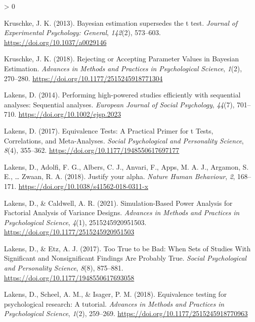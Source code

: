 \documentclass[
  english,
  ,jou,floatsintext]{apa6}
\newlength{\cslhangindent}
\newenvironment{CSLReferences}[2] %
 {%
  \setlength{\parindent}{0pt}
  \ifodd #1 \everypar{\setlength{\hangindent}{\cslhangindent}}\ignorespaces\fi
  \ifnum #2 > 0
  \setlength{\parskip}{#2\baselineskip}
  \fi
 }%
 {}
\begin{document}
\begin{CSLReferences}{1}{0}
\leavevmode\hypertarget{ref-kruschke_bayesian_2013}{}%
Kruschke, J. K. (2013). Bayesian estimation supersedes the t test. \emph{Journal of Experimental Psychology: General}, \emph{142}(2), 573--603. \url{https://doi.org/10.1037/a0029146}

\leavevmode\hypertarget{ref-kruschke_rejecting_2018}{}%
Kruschke, J. K. (2018). Rejecting or {Accepting Parameter Values} in {Bayesian Estimation}. \emph{Advances in Methods and Practices in Psychological Science}, \emph{1}(2), 270--280. \url{https://doi.org/10.1177/2515245918771304}

\leavevmode\hypertarget{ref-lakens_performing_2014}{}%
Lakens, D. (2014). Performing high-powered studies efficiently with sequential analyses: {Sequential} analyses. \emph{European Journal of Social Psychology}, \emph{44}(7), 701--710. \url{https://doi.org/10.1002/ejsp.2023}

\leavevmode\hypertarget{ref-lakens_equivalence_2017}{}%
Lakens, D. (2017). Equivalence {Tests}: {A Practical Primer} for t {Tests}, {Correlations}, and {Meta-Analyses}. \emph{Social Psychological and Personality Science}, \emph{8}(4), 355--362. \url{https://doi.org/10.1177/1948550617697177}

\leavevmode\hypertarget{ref-lakens_justify_2018}{}%
Lakens, D., Adolfi, F. G., Albers, C. J., Anvari, F., Apps, M. A. J., Argamon, S. E., \ldots{} Zwaan, R. A. (2018). Justify your alpha. \emph{Nature Human Behaviour}, \emph{2}, 168--171. \url{https://doi.org/10.1038/s41562-018-0311-x}

\leavevmode\hypertarget{ref-lakens_simulation-based_2021}{}%
Lakens, D., \& Caldwell, A. R. (2021). Simulation-{Based Power Analysis} for {Factorial Analysis} of {Variance Designs}. \emph{Advances in Methods and Practices in Psychological Science}, \emph{4}(1), 2515245920951503. \url{https://doi.org/10.1177/2515245920951503}

\leavevmode\hypertarget{ref-lakens_too_2017}{}%
Lakens, D., \& Etz, A. J. (2017). Too {True} to be {Bad}: {When Sets} of {Studies With Significant} and {Nonsignificant Findings Are Probably True}. \emph{Social Psychological and Personality Science}, \emph{8}(8), 875--881. \url{https://doi.org/10.1177/1948550617693058}

\leavevmode\hypertarget{ref-lakens_equivalence_2018}{}%
Lakens, D., Scheel, A. M., \& Isager, P. M. (2018). Equivalence testing for psychological research: {A} tutorial. \emph{Advances in Methods and Practices in Psychological Science}, \emph{1}(2), 259--269. \url{https://doi.org/10.1177/2515245918770963}


\end{CSLReferences}
\end{document}
